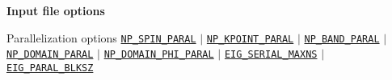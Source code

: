 \begin{frame}[allowframebreaks]{\textbf{Input file options}}
\begin{block}{Parallelization options}
\hyperlink{NP_SPIN_PARAL}{\texttt{NP\_SPIN\_PARAL}} $\vert$
\hyperlink{NP_KPOINT_PARAL}{\texttt{NP\_KPOINT\_PARAL}} $\vert$
\hyperlink{NP_BAND_PARAL}{\texttt{NP\_BAND\_PARAL}} $\vert$
\hyperlink{NP_DOMAIN_PARAL}{\texttt{NP\_DOMAIN\_PARAL}} $\vert$
\hyperlink{NP_DOMAIN_PHI_PARAL}{\texttt{NP\_DOMAIN\_PHI\_PARAL}} $\vert$
\hyperlink{EIG_SERIAL_MAXNS}{\texttt{EIG\_SERIAL\_MAXNS}} $\vert$
\hyperlink{EIG_PARAL_BLKSZ}{\texttt{EIG\_PARAL\_BLKSZ}}
\end{block}

\end{frame}
